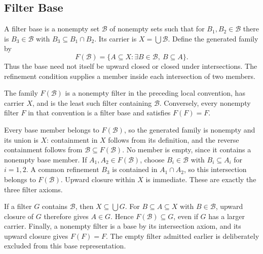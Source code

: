 \subsection{Filter Base}
\begin{definition}
A filter base is a nonempty set $\mathcal B$ of nonempty sets such that
for $B_1,B_2\in\mathcal B$ there is $B_3\in\mathcal B$ with
$B_3\subseteq B_1\cap B_2$. Its carrier is $X=\bigcup\mathcal B$.
Define the generated family by
\[
F(\mathcal B)=\{A\subseteq X:\exists B\in\mathcal B,\ B\subseteq A\}.
\]
Thus the base need not itself be upward closed or closed under
intersections. The refinement condition supplies a member inside each
intersection of two members.
\end{definition}

\begin{proposition}
\label{prop:filter_base_generation}
The family $F(\mathcal B)$ is a nonempty filter in the preceding local
convention, has carrier $X$, and is the least such filter containing
$\mathcal B$. Conversely, every nonempty filter $F$ in that convention
is a filter base and satisfies $F(F)=F$.
\end{proposition}
\Proof
Every base member belongs to $F(\mathcal B)$, so the generated family
is nonempty and its union is $X$: containment in $X$ follows from its
definition, and the reverse containment follows from
$\mathcal B\subseteq F(\mathcal B)$. No member is empty, since it
contains a nonempty base member. If $A_1,A_2\in F(\mathcal B)$,
choose $B_i\in\mathcal B$ with $B_i\subseteq A_i$ for $i=1,2$.
A common refinement $B_3$ is contained in $A_1\cap A_2$, so this
intersection belongs to $F(\mathcal B)$. Upward closure within $X$
is immediate. These are exactly the three filter axioms.

If a filter $G$ contains $\mathcal B$, then $X\subseteq\bigcup G$.
For $B\subseteq A\subseteq X$ with $B\in\mathcal B$, upward
closure of $G$ therefore gives $A\in G$. Hence
$F(\mathcal B)\subseteq G$, even if $G$ has a larger carrier.
Finally, a nonempty filter is a base by its intersection axiom, and
its upward closure gives $F(F)=F$. The empty filter admitted earlier
is deliberately excluded from this base representation.
\Done

